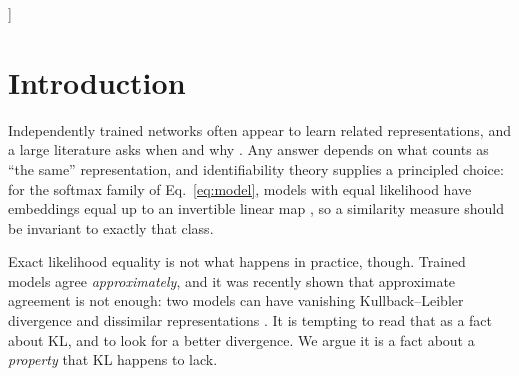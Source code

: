 \documentclass[10pt,letterpaper,twocolumn]{article}
\newcommand{\simL}{\sim_{L}}
\theoremstyle{plain}
\theoremstyle{definition}
\theoremstyle{remark}
\begin{document}
\begin{minipage}{\textwidth}
\begin{center}
\begin{minipage}{0.86\textwidth}
\begin{abstract}
$M{=}3$, though only $13\%$ at $M{=}5$ as $\lambda_{\max}$ grows. We complement them with the positive
theory that says what would be required: a dichotomy
($\alpha^{\star}_{\mathrm{sym}}=\infty$ exactly for $\simL$-equivalent pairs)
and graded control ($d=O(1/\alpha)$), which together confine the controlling
orders to an explicit interval. The practical output is therefore a
\emph{diagnostic} rather than a certificate: $\delta_{m}$,
$\Delta/\psi_{\min}$, $\lambda_{\max}$ and $\alpha^{\star}_{\mathrm{sym}}$ are
cheap to compute and bound in advance how much any likelihood comparison can
reveal. Experiments on synthetic data and CIFAR-10 confirm the mechanism, and
a temperature intervention that holds representational dissimilarity exactly
fixed while moving the confidence floor isolates it causally.
\end{abstract}
\end{minipage}\end{center}
\vspace{10pt}
\end{minipage}
]

\section{Introduction}
\label{sec:intro}

Independently trained networks often appear to learn related representations,
and a large literature asks when and why \cite{kornblith2019,nielsen2025}. Any
answer depends on what counts as ``the same'' representation, and
identifiability theory supplies a principled choice: for the softmax family of
Eq.~\eqref{eq:model}, models with equal likelihood have embeddings equal up to
an invertible linear map \cite{roeder2021,khemakhem2020,lachapelle2023}, so a
similarity measure should be invariant to exactly that class.

Exact likelihood equality is not what happens in practice, though. Trained
models agree \emph{approximately}, and it was recently shown that approximate
agreement is not enough: two models can have vanishing Kullback--Leibler
divergence and dissimilar representations \cite{nielsen2025}. It is tempting to
read that as a fact about KL, and to look for a better divergence. We argue it
is a fact about a \emph{property} that KL happens to lack.
\end{document}
